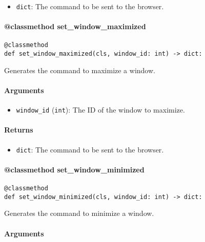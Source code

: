 \documentclass{article}
\begin{document}
\begin{itemize}
    \item \lstinline[style=pythonstyle]|dict|: The command to be sent to the browser.
\end{itemize}

\paragraph{@classmethod set\_window\_maximized}

\begin{lstlisting}[style=pythonstyle]
@classmethod
def set_window_maximized(cls, window_id: int) -> dict:
\end{lstlisting}

\noindent Generates the command to maximize a window.

\paragraph{Arguments}

\begin{itemize}
    \item \lstinline[style=pythonstyle]|window_id| (\lstinline[style=pythonstyle]|int|): The ID of the window to maximize.
\end{itemize}

\paragraph{Returns}

\begin{itemize}
    \item \lstinline[style=pythonstyle]|dict|: The command to be sent to the browser.
\end{itemize}

\paragraph{@classmethod set\_window\_minimized}

\begin{lstlisting}[style=pythonstyle]
@classmethod
def set_window_minimized(cls, window_id: int) -> dict:
\end{lstlisting}

\noindent Generates the command to minimize a window.

\paragraph{Arguments}
\end{document}
